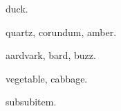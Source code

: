 \documentclass{article}
\begin{document}
\gls{duck}.

\gls{quartz}, \gls{corundum}, \gls{amber}.

\gls{aardvark}, \gls{bard}, \gls{buzz}.

\gls{vegetable}, \gls{cabbage}.

\gls{subsubitem}.

\printunsrtglossaries
\end{document}
